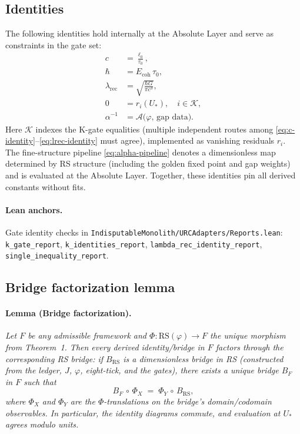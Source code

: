 \documentclass[11pt]{article}
\begin{document}
\subsection{Identities}
The following identities hold internally at the Absolute Layer and serve as constraints in the gate set:
\begin{align}
  c &= \frac{\ell_0}{\tau_0}, \label{eq:c-identity} \\
  \hbar &= E_{\mathrm{coh}}\,\tau_0, \label{eq:hbar-identity} \\
  \lambda_{\mathrm{rec}} &= \sqrt{\frac{\hbar G}{\pi c^3}}, \label{eq:lrec-identity} \\
  0 &= r_i(U_*), \quad i\in\mathcal{K}, \label{eq:kgates-zero} \\
  \alpha^{-1} &= \mathcal{A}\bigl(\varphi,\,\text{gap data}\bigr). \label{eq:alpha-pipeline}
\end{align}
Here \(\mathcal{K}\) indexes the K\mbox{-}gate equalities (multiple independent routes among \eqref{eq:c-identity}--\eqref{eq:lrec-identity} must agree), implemented as vanishing residuals \(r_i\). The fine\mbox{-}structure pipeline \eqref{eq:alpha-pipeline} denotes a dimensionless map determined by RS structure (including the golden fixed point and gap weights) and is evaluated at the Absolute Layer. Together, these identities pin all derived constants without fits.

\paragraph{Lean anchors.} Gate identity checks in \texttt{IndisputableMonolith/URCAdapters/Reports.lean}: \texttt{k\_gate\_report}, \texttt{k\_identities\_report}, \texttt{lambda\_rec\_identity\_report}, \texttt{single\_inequality\_report}.

\subsection{Bridge factorization lemma}
\paragraph{Lemma (Bridge factorization).} \emph{Let \(F\) be any admissible framework and \(\Phi\colon \mathrm{RS}(\varphi)\to F\) the unique morphism from Theorem~1. Then every derived identity/bridge in \(F\) factors through the corresponding RS bridge: if \(B_{\mathrm{RS}}\) is a dimensionless bridge in RS (constructed from the ledger, \(J\), \(\varphi\), eight\mbox{-}tick, and the gates), there exists a unique bridge \(B_F\) in \(F\) such that}
\[
  B_F\,\circ\, \Phi_X \;=\; \Phi_Y\,\circ\, B_{\mathrm{RS}},
\]
\emph{where \(\Phi_X\) and \(\Phi_Y\) are the \(\Phi\)\mbox{-}translations on the bridge's domain/codomain observables. In particular, the identity diagrams commute, and evaluation at \(U_*\) agrees modulo units.}
\end{document}
